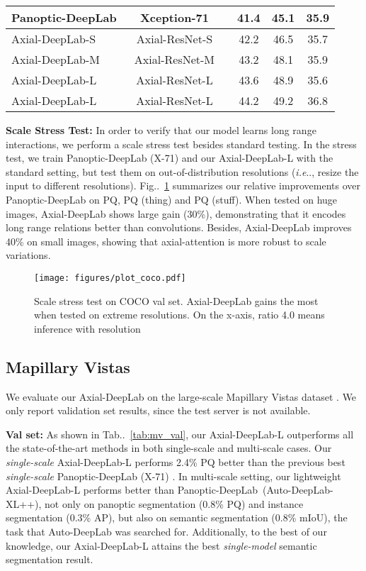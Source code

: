 \documentclass[runningheads]{llncs}
\makeatletter
\DeclareRobustCommand\onedot{\futurelet\@let@token\@onedot}
\def\@onedot{\ifx\@let@token.\else.\null\fi\xspace}
\def\ie{\emph{i.e}\onedot} \def\Ie{\emph{I.e}\onedot}
\newcommand{\figref}[1]{Fig\onedot~\ref{#1}}
\newcommand{\tabref}[1]{Tab\onedot~\ref{#1}}
\newcommand{\cmark}{\ding{51}}
\makeatother
\begin{document}
\begin{table}[!t]
{\begin{tabular}{l|c|c|ccc}
            Panoptic-DeepLab~\cite{cheng2019panoptic} & Xception-71 & \cmark & 41.4 & 45.1 & 35.9 \\
            \midrule \midrule
            Axial-DeepLab-S & Axial-ResNet-S & & 42.2 & 46.5 & 35.7 \\
            Axial-DeepLab-M & Axial-ResNet-M & & 43.2 & 48.1 & 35.9 \\
            Axial-DeepLab-L & Axial-ResNet-L & & 43.6 & 48.9 & 35.6 \\
            Axial-DeepLab-L & Axial-ResNet-L & \cmark & 44.2 & 49.2 & 36.8 \\
            \bottomrule[0.1em]
        \end{tabular}
        }
    \end{table}

{\bf Scale Stress Test:} In order to verify that our model learns long range interactions, we perform a scale stress test besides standard testing. In the stress test, we train Panoptic-DeepLab (X-71) and our Axial-DeepLab-L with the standard setting, but test them on out-of-distribution resolutions (\ie, resize the input to different resolutions). \figref{fig:scale} summarizes our relative improvements over Panoptic-DeepLab on PQ, PQ (thing) and PQ (stuff). When tested on huge images, Axial-DeepLab shows large gain (30\%), demonstrating that it encodes long range relations better than convolutions. Besides, Axial-DeepLab improves 40\% on small images, showing that axial-attention is more robust to scale variations.

\begin{figure}[!t]
    \centering
    \texttt{[image: figures/plot\_coco.pdf]}
    \caption{Scale stress test on COCO val set. Axial-DeepLab gains the most when tested on extreme resolutions. On the x-axis, ratio 4.0 means inference with resolution }
    \label{fig:scale}
\end{figure}

\subsection{Mapillary Vistas}

We evaluate our Axial-DeepLab on the large-scale Mapillary Vistas dataset \cite{neuhold2017mapillary}. We only report validation set results, since the test server is not available.

{\bf Val set:} As shown in \tabref{tab:mv_val}, our Axial-DeepLab-L outperforms all the state-of-the-art methods in both single-scale and multi-scale cases. Our {\it single-scale} Axial-DeepLab-L performs 2.4\% PQ better than the previous best {\it single-scale} Panoptic-DeepLab (X-71) \cite{cheng2019panoptic}. In multi-scale setting, our lightweight Axial-DeepLab-L performs better than Panoptic-DeepLab~(Auto-DeepLab-XL++), not only on panoptic segmentation (0.8\% PQ) and instance segmentation (0.3\% AP), but also on semantic segmentation (0.8\% mIoU), the task that Auto-DeepLab \cite{liu2019auto} was searched for. Additionally, to the best of our knowledge, our Axial-DeepLab-L attains the best {\it single-model} semantic segmentation result.
\end{document}
